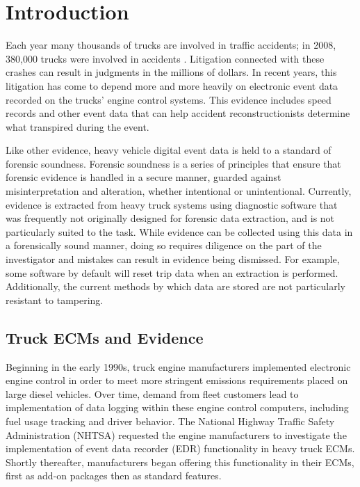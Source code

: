 \chapter{Introduction}
Each year many thousands of trucks are involved in traffic accidents; in 2008, 380,000 trucks were involved in accidents \cite{NHTSA2008}.
Litigation connected with these crashes can result in judgments in the millions of dollars. In recent years, this litigation has 
come to depend more and more heavily on electronic event data recorded on the trucks' engine control systems. 
This evidence includes speed records and other event data that can help accident reconstructionists 
determine what transpired during the event.

Like other evidence, heavy vehicle digital event data is held to a standard of forensic soundness. Forensic soundness is a series of principles 
that ensure that forensic evidence is handled in a secure manner, guarded against misinterpretation and alteration, whether intentional
or unintentional.
Currently, evidence is extracted from heavy truck systems using diagnostic software that was frequently not originally designed for forensic data extraction, 
and is not particularly suited to the task. While evidence can be collected using this data in a forensically sound 
manner, doing so requires diligence on the part of the investigator and mistakes can result in evidence being dismissed. For example, some software by default will
reset trip data when an extraction is performed.
Additionally, the current methods by which data are stored are not particularly resistant to tampering\cite{Johnson2014}. 

\section{Truck ECMs and Evidence}

Beginning in the early 1990s, truck engine manufacturers implemented electronic engine control in order to meet more stringent emissions
requirements placed on large diesel vehicles\cite{NHTSA-EDR-2002}. Over time, demand from fleet customers lead to implementation of data logging within these
engine control computers, including fuel usage tracking and driver behavior. The National Highway Traffic Safety Administration (NHTSA) 
requested the engine manufacturers to investigate the implementation
of event data recorder (EDR) functionality in heavy truck ECMs. Shortly thereafter, manufacturers began offering this functionality in their
ECMs, first as add-on packages then as standard features.

